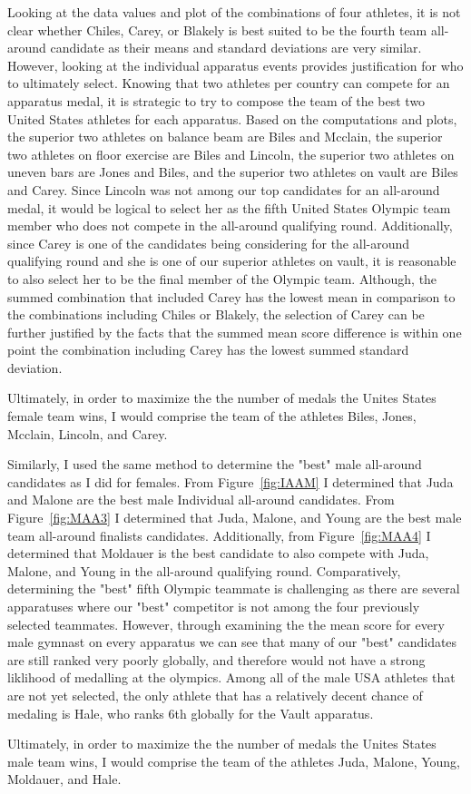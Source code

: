 \documentclass[12pt]{article}
\begin{document}
Looking at the data values and plot of the combinations of four athletes, it is not clear whether Chiles, Carey, or 
Blakely is best suited to be the fourth team all-around candidate as their means and standard deviations are very 
similar. However, looking at the individual apparatus events provides justification for who to ultimately select. 
Knowing that two athletes per country can compete for an apparatus medal, it is strategic to try to compose the 
team of the best two United States athletes for each apparatus. Based on the computations and plots, the superior two 
athletes on balance beam are Biles and Mcclain, the superior two athletes on floor exercise are Biles and Lincoln, 
the superior two athletes on uneven bars are Jones and Biles, and the superior two athletes on vault are Biles 
and Carey. Since Lincoln was not among our top candidates for an all-around medal, it would be logical to select her 
as the fifth United States Olympic team member who does not compete in the all-around qualifying round. Additionally, 
since Carey is one of the candidates being considering for the all-around qualifying round and she is one of our superior 
athletes on vault, it is reasonable to also select her to be the final member of the Olympic team. Although, the 
summed combination that included Carey has the lowest mean in comparison to the combinations including Chiles or 
Blakely, the selection of Carey can be further justified by the facts that the summed mean score difference is 
within one point the combination including Carey has the lowest summed standard deviation.

Ultimately, in order to maximize the the number of medals the Unites States female team wins, I would comprise the 
team of the athletes Biles, Jones, Mcclain, Lincoln, and Carey.

Similarly, I used the same method to determine the "best" male all-around candidates as I did for females. From 
Figure~\ref{fig:IAAM} I determined that Juda and Malone are the best male Individual all-around candidates. From 
Figure~\ref{fig:MAA3} I determined that Juda, Malone, and Young are the best male team all-around finalists 
candidates. Additionally, from Figure~\ref{fig:MAA4} I determined that Moldauer is the best candidate to also compete 
with Juda, Malone, and Young in the all-around qualifying round. Comparatively, determining the "best" fifth Olympic 
teammate is challenging as there are several apparatuses where our "best" competitor is not among the four 
previously selected teammates. However, through examining the the mean score for every male gymnast on every apparatus 
we can see that many of our "best" candidates are still ranked very poorly globally, and therefore would not have a 
strong liklihood of medalling at the olympics. Among all of the male USA athletes that are not yet selected, the only 
athlete that has a relatively decent chance of medaling is Hale, who ranks 6th globally for the Vault apparatus.

Ultimately, in order to maximize the the number of medals the Unites States male team wins, I would comprise the 
team of the athletes Juda, Malone, Young, Moldauer, and Hale.



\end{document}
